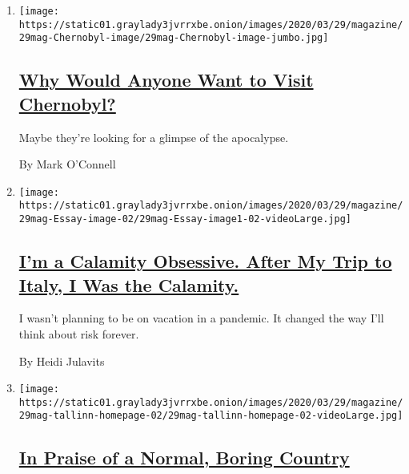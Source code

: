 \begin{enumerate}
\def\labelenumi{\arabic{enumi}.}
\item
  \texttt{[image: https://static01.graylady3jvrrxbe.onion/images/2020/03/29/magazine/29mag-Chernobyl-image/29mag-Chernobyl-image-jumbo.jpg]}

  \hypertarget{why-would-anyone-want-to-visit-chernobyl}{%
  \subsection{\texorpdfstring{\href{/interactive/2020/03/24/magazine/chernobyl-tourism.html}{Why
  Would Anyone Want to Visit
  Chernobyl?}}{Why Would Anyone Want to Visit Chernobyl?}}\label{why-would-anyone-want-to-visit-chernobyl}}

  Maybe they're looking for a glimpse of the apocalypse.

  By Mark O'Connell
\item
  \texttt{[image: https://static01.graylady3jvrrxbe.onion/images/2020/03/29/magazine/29mag-Essay-image-02/29mag-Essay-image1-02-videoLarge.jpg]}

  \hypertarget{im-a-calamity-obsessive-after-my-trip-to-italy-i-was-the-calamity}{%
  \subsection{\texorpdfstring{\href{/interactive/2020/03/24/magazine/travel-corona-virus-italy.html}{I'm
  a Calamity Obsessive. After My Trip to Italy, I Was the
  Calamity.}}{I'm a Calamity Obsessive. After My Trip to Italy, I Was the Calamity.}}\label{im-a-calamity-obsessive-after-my-trip-to-italy-i-was-the-calamity}}

  I wasn't planning to be on vacation in a pandemic. It changed the way
  I'll think about risk forever.

  By Heidi Julavits
\item
  \texttt{[image: https://static01.graylady3jvrrxbe.onion/images/2020/03/29/magazine/29mag-tallinn-homepage-02/29mag-tallinn-homepage-02-videoLarge.jpg]}

  \hypertarget{in-praise-of-a-normal-boring-country}{%
  \subsection{\texorpdfstring{\href{/interactive/2020/03/25/magazine/dispatches-estonia.html}{In
  Praise of a Normal, Boring
  Country}}{In Praise of a Normal, Boring Country}}\label{in-praise-of-a-normal-boring-country}}


\end{enumerate}
